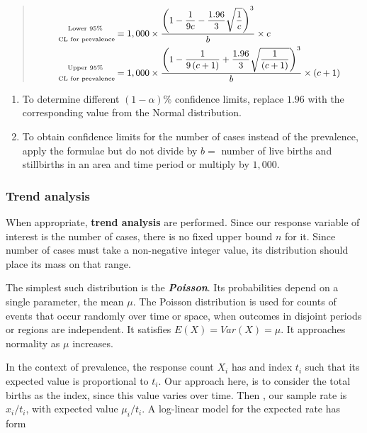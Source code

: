 \documentclass[
]{krantz}
\providecommand{\tightlist}{%
  \setlength{\itemsep}{0pt}\setlength{\parskip}{0pt}}
\begin{document}
\begin{quote}
\[
\small
\begin{aligned}
\substack{\text{Lower } 95\% \\ \\ \text{ CL for prevalence}} &= 1,000 \times \dfrac{\left( 1- \dfrac{1}{9c}-\dfrac{1.96}{3}\sqrt{\dfrac{1}{c}} \right)^{3}}{b}\times c \\
\substack{\text{Upper } 95\% \\ \\ \text{ CL for prevalence}} &= 1,000 \times \dfrac{\left( 1- \dfrac{1}{9\left(c+1\right)}+\dfrac{1.96}{3}\sqrt{\dfrac{1}{\left(c+1\right)}} \right)^{3}}{b}\times \left(c+1\right) 
\end{aligned}
\]
\end{quote}

\begin{enumerate}
\def\labelenumi{\arabic{enumi}.}
\setcounter{enumi}{1}
\tightlist
\item
  To determine different \(\left(1 - \alpha \right) \%\) confidence limits, replace \(1.96\) with the corresponding value from the Normal distribution.
\item
  To obtain confidence limits for the number of cases instead of the prevalence, apply the formulae but do not divide by \(b=\) number of live births and stillbirths in an area and time period or multiply by \(1,000\).
\end{enumerate}

\hypertarget{trend-analysis}{%
\subsubsection*{Trend analysis}\label{trend-analysis}}


When appropriate, \textbf{trend analysis} are performed. Since our response variable of interest is the number of cases, there is no fixed upper bound \(n\) for it. Since number of cases must take a non-negative integer value, its distribution should place its mass on that range.

The simplest such distribution is the \textbf{\emph{Poisson}}. Its probabilities depend on a single parameter, the mean \(\mu\). The Poisson distribution is used for counts of events that occur randomly over time or space, when outcomes in disjoint periods or regions are independent. It satisfies \(E\left(X\right)=Var\left(X\right)=\mu\). It approaches normality as \(\mu\) increases.

In the context of prevalence, the response count \(X_{i}\) has and index \(t_{i}\) such that its expected value is proportional to \(t_{i}\). Our approach here, is to consider the total births as the index, since this value varies over time. Then , our sample rate is \(x_{i}/t_{i}\), with expected value \(\mu_{i}/t_{i}\). A log-linear model for the expected rate has form
\end{document}
